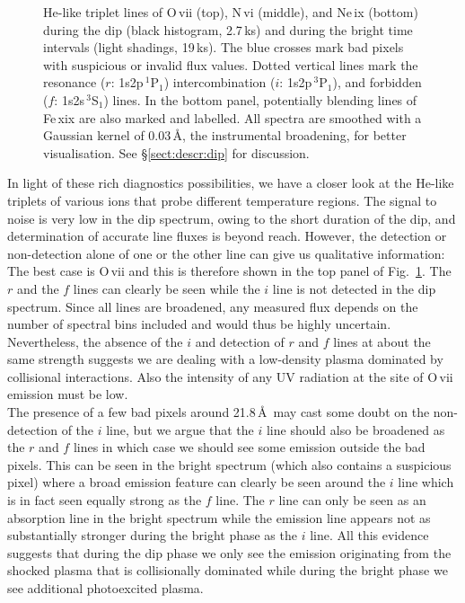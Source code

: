 \documentclass{aa}
\begin{document}
\begin{figure}[!ht]
\caption{\label{fig:he}He-like triplet lines of O\,{\sc vii} (top),
N\,{\sc vi} (middle), and Ne\,{\sc ix} (bottom) during the dip (black
histogram, 2.7\,ks) and during the bright time intervals (light
shadings, 19\,ks). The blue crosses mark bad
pixels with suspicious or invalid flux values. Dotted vertical lines
mark the resonance ($r$: 1s2p\,$^1$P$_1$)
intercombination ($i$: 1s2p\,$^3$P$_1$), and forbidden
($f$: 1s2s\,$^3$S$_1$) lines. In the bottom panel, potentially
blending lines of Fe\,{\sc xix} are also marked and labelled.
All spectra are smoothed with a Gaussian kernel of 0.03\,\AA, the
instrumental broadening, for better visualisation.
See \S\ref{sect:descr:dip} for discussion.
}
\end{figure}

In light of these rich diagnostics possibilities, we have a closer
look at the He-like triplets of various ions that probe different
temperature regions.
The signal to noise is very low in the dip spectrum, owing to the short
duration of the dip, and determination of accurate line fluxes is beyond
reach. However, the detection or non-detection alone
of one or the other line can give us qualitative information:\\

The best case is O\,{\sc vii} and this is therefore shown in the top panel
of Fig.~\ref{fig:he}. 
The $r$ and the $f$ lines can clearly be seen while the $i$
line is not detected in the dip spectrum. Since all lines are broadened,
any measured flux depends on the number of spectral bins included and
would thus be highly uncertain. Nevertheless, the absence of the
$i$ and detection of $r$ and $f$ lines at about the same strength suggests we
are dealing with a low-density plasma dominated by collisional
interactions. Also the intensity of any UV radiation at the site of
O\,{\sc vii} emission must be low.\\
The presence of a few bad pixels around 21.8\,\AA\ may cast some doubt on
the non-detection of the $i$ line, but we argue that the $i$ line should also
be broadened as the $r$ and $f$ lines in which case we should see some
emission outside the bad pixels. This can be seen in the bright spectrum 
(which also contains a suspicious pixel) where a broad emission feature
can clearly be seen around the $i$ line which is in fact seen equally
strong as the $f$ line. The $r$ line can only be seen as an absorption line
in the bright spectrum while the emission line appears not as substantially
stronger during the bright phase as the $i$ line. All this evidence
suggests that during the dip phase we only see the emission originating
from the shocked plasma that is collisionally dominated while during
the bright phase we see additional photoexcited plasma.\\
\end{document}
